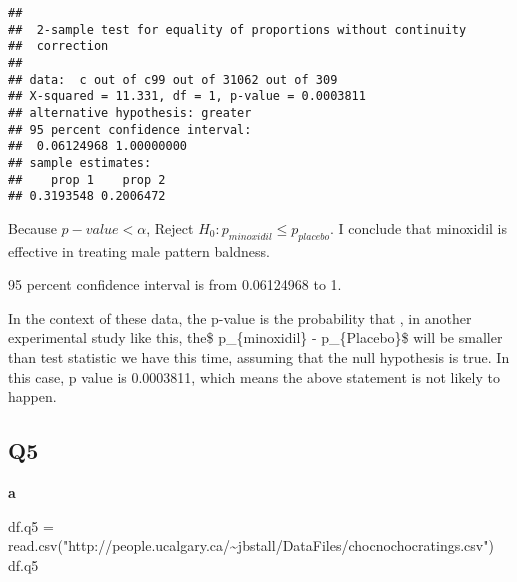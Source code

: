 \documentclass[
]{article}
\newenvironment{Shaded}{\begin{snugshade}}{\end{snugshade}}
\newcommand{\FunctionTok}[1]{\textcolor[rgb]{0.00,0.00,0.00}{#1}}
\newcommand{\NormalTok}[1]{#1}
\newcommand{\OtherTok}[1]{\textcolor[rgb]{0.56,0.35,0.01}{#1}}
\newcommand{\StringTok}[1]{\textcolor[rgb]{0.31,0.60,0.02}{#1}}
\begin{document}
\begin{verbatim}
## 
##  2-sample test for equality of proportions without continuity
##  correction
## 
## data:  c out of c99 out of 31062 out of 309
## X-squared = 11.331, df = 1, p-value = 0.0003811
## alternative hypothesis: greater
## 95 percent confidence interval:
##  0.06124968 1.00000000
## sample estimates:
##    prop 1    prop 2 
## 0.3193548 0.2006472
\end{verbatim}

Because \(p-value < \alpha\), Reject
\(H_{0}:p_{minoxidil} \le p_{placebo}\). I conclude that minoxidil is
effective in treating male pattern baldness.

95 percent confidence interval is from 0.06124968 to 1.

In the context of these data, the p-value is the probability that , in
another experimental study like this, the\$ p\_\{minoxidil\} -
p\_\{Placebo\}\$ will be smaller than test statistic we have this time,
assuming that the null hypothesis is true. In this case, p value is
0.0003811, which means the above statement is not likely to happen.

\hypertarget{q5}{%
\subsection{Q5}\label{q5}}

\textbf{a}

\begin{Shaded}
\begin{Highlighting}[]
\NormalTok{df.q5 }\OtherTok{=} \FunctionTok{read.csv}\NormalTok{(}\StringTok{"http://people.ucalgary.ca/\textasciitilde{}jbstall/DataFiles/chocnochocratings.csv"}\NormalTok{)}
\NormalTok{df.q5}
\end{Highlighting}
\end{Shaded}
\end{document}
